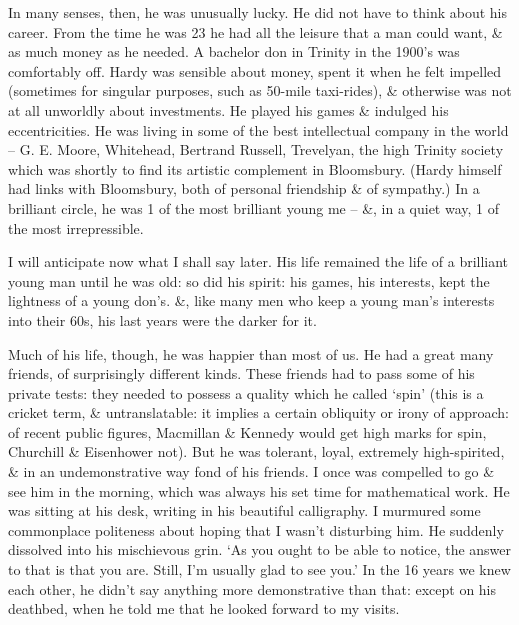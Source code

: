 \documentclass{article}
\numberwithin{equation}{section}
\begin{document}
In many senses, then, he was unusually lucky. He did not have to think about his career. From the time he was 23 he had all the leisure that a man could want, \& as much money as he needed. A bachelor don in Trinity in the 1900's was comfortably off. Hardy was sensible about money, spent it when he felt impelled (sometimes for singular purposes, such as 50-mile taxi-rides), \& otherwise was not at all unworldly about investments. He played his games \& indulged his eccentricities. He was living in some of the best intellectual company in the world -- G. E. Moore, Whitehead, Bertrand Russell, Trevelyan, the high Trinity society which was shortly to find its artistic complement in Bloomsbury. (Hardy himself had links with Bloomsbury, both of personal friendship \& of sympathy.) In a brilliant circle, he was 1 of the most brilliant young me -- \&, in a quiet way, 1 of the most irrepressible.

I will anticipate now what I shall say later. His life remained the life of a brilliant young man until he was old: so did his spirit: his games, his interests, kept the lightness of a young don's. \&, like many men who keep a young man's interests into their 60s, his last years were the darker for it.

Much of his life, though, he was happier than most of us. He had a great many friends, of surprisingly different kinds. These friends had to pass some of his private tests: they needed to possess a quality which he called `spin' (this is a cricket term, \& untranslatable: it implies a certain obliquity or irony of approach: of recent public figures, Macmillan \& Kennedy would get high marks for spin, Churchill \& Eisenhower not). But he was tolerant, loyal, extremely high-spirited, \& in an undemonstrative way fond of his friends. I once was compelled to go \& see him in the morning, which was always his set time for mathematical work. He was sitting at his desk, writing in his beautiful calligraphy. I murmured some commonplace politeness about hoping that I wasn't disturbing him. He suddenly dissolved into his mischievous grin. `As you ought to be able to notice, the answer to that is that you are. Still, I'm usually glad to see you.' In the 16 years we knew each other, he didn't say anything more demonstrative than that: except on his deathbed, when he told me that he looked forward to my visits.
\end{document}
